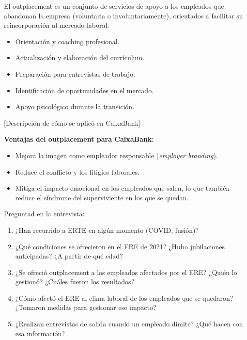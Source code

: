 
El outplacement es un conjunto de servicios de apoyo a los empleados
que abandonan la empresa (voluntaria o involuntariamente), orientados a
facilitar su reincorporación al mercado laboral:

\begin{itemize}
  \item Orientación y coaching profesional.
  \item Actualización y elaboración del currículum.
  \item Preparación para entrevistas de trabajo.
  \item Identificación de oportunidades en el mercado.
  \item Apoyo psicológico durante la transición.
\end{itemize}

[Descripción de cómo se aplicó en CaixaBank]

\textbf{Ventajas del outplacement para CaixaBank:}
\begin{itemize}
  \item Mejora la imagen como empleador responsable (\textit{employer branding}).
  \item Reduce el conflicto y los litigios laborales.
  \item Mitiga el impacto emocional en los empleados que salen, lo que
        también reduce el síndrome del superviviente en los que se quedan.
\end{itemize}

\begin{notaequipo}
  Preguntad en la entrevista:
  \begin{enumerate}
    \item ¿Han recurrido a ERTE en algún momento (COVID, fusión)?
    \item ¿Qué condiciones se ofrecieron en el ERE de 2021?
          ¿Hubo jubilaciones anticipadas? ¿A partir de qué edad?
    \item ¿Se ofreció outplacement a los empleados afectados por el ERE?
          ¿Quién lo gestionó? ¿Cuáles fueron los resultados?
    \item ¿Cómo afectó el ERE al clima laboral de los empleados que se
          quedaron? ¿Tomaron medidas para gestionar ese impacto?
    \item ¿Realizan entrevistas de salida cuando un empleado dimite?
          ¿Qué hacen con esa información?
  \end{enumerate}
\end{notaequipo}
